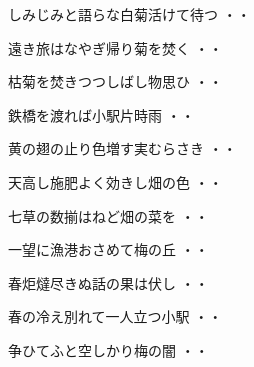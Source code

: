 \vspace{0.6cm}
\begin{shiika}しみじみと語らな白菊活けて待つ
\hfill{・・}\end{shiika}
\vspace{0.6cm}
\begin{shiika}遠き旅はなやぎ帰り菊を焚く
\hfill{・・}\end{shiika}
\vspace{0.6cm}
\begin{shiika}枯菊を焚きつつしばし物思ひ
\hfill{・・}\end{shiika}
\vspace{0.6cm}
\begin{shiika}鉄橋を渡れば小駅片時雨
\hfill{・・}\end{shiika}
\vspace{0.6cm}
\begin{shiika}黄の翅の止り色増す実むらさき
\hfill{・・}\end{shiika}
\vspace{0.6cm}
\begin{shiika}天高し施肥よく効きし畑の色
\hfill{・・}\end{shiika}
\vspace{0.6cm}
\begin{shiika}七草の数揃はねど畑の菜を
\hfill{・・}\end{shiika}
\vspace{0.6cm}
\begin{shiika}一望に漁港おさめて梅の丘
\hfill{・・}\end{shiika}
\vspace{0.6cm}
\begin{shiika}春炬燵尽きぬ話の果は伏し
\hfill{・・}\end{shiika}
\vspace{0.6cm}
\begin{shiika}春の冷え別れて一人立つ小駅
\hfill{・・}\end{shiika}
\vspace{0.6cm}
\begin{shiika}争ひてふと空しかり梅の闇
\hfill{・・}\end{shiika}
